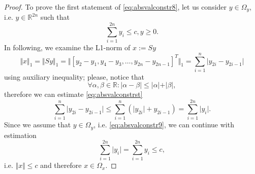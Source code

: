 \begin{proof}
\vspace{0.5cm}

\noindent To prove the first statement of \eqref{eq:absvalconstr8}, let us consider $y \in \Omega_y$, i.e. $y \in \mathbb{R}^{2n}$ such that
\begin{equation}
 \label{eq:absvalconstr9}
 \sum\limits_{i = 1}^{2n} y_i \leq c, y \geq 0.
\end{equation}
In following, we examine the L1-norm of $x := Sy$
\begin{equation}
 \label{eq:absvalconstrst}
 \Vert x \Vert_1 = \Vert Sy \Vert_1 = \Vert [y_2 - y_1, y_4 - y_3, \dots, y_{2n} - y_{2n-1}]^T \Vert_1 = \sum\limits_{i =1}^n \vert y_{2i} - y_{2i-1} \vert
\end{equation}
using auxiliary inequality; please, notice that
\begin{displaymath}
 \forall \alpha, \beta \in \mathbb{R}: \vert \alpha - \beta \vert \leq \vert \alpha \vert + \vert \beta \vert,
\end{displaymath}
therefore we can estimate \eqref{eq:absvalconstrst}
\begin{displaymath}
 \sum\limits_{i = 1}^{n} \vert y_{2i} - y_{2i-1} \vert \leq \sum\limits_{i=1}^n \left( \vert y_{2i} \vert + y_{2i-1} \right) = \sum\limits_{i=1}^{2n} \vert y_i \vert .
\end{displaymath}
Since we assume that $y \in \Omega_y$, i.e. \eqref{eq:absvalconstr9}, we can continue with estimation
\begin{displaymath}
 \sum\limits_{i=1}^{2n} \vert y_i \vert = \sum\limits_{i=1}^{2n} y_i  \leq c,
\end{displaymath}
i.e. $\Vert x \Vert \leq c$ and therefore $x \in \Omega_x$. \newline

\vspace{0.5cm}


\end{proof}
